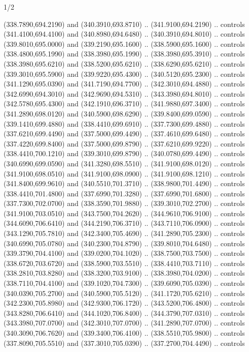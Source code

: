 \begin{flagdescription}{1/2}
\begin{scope}[xshift=0.5\flaglength]
\begin{scope}[scale=0.00745\flagwidth,xshift=-12.1mm,yshift=41.7mm]
\begin{scope}[y=0.80pt, x=0.80pt, yscale=-1, xscale=1, inner sep=0pt, outer sep=0pt]
\begin{scope}[cm={{1.33333,0.0,0.0,-1.33333,(0.0,114.66667)}}]
\begin{scope}[scale=0.100]
  (338.7890,694.2190) and (340.3910,693.8710) .. (341.9100,694.2190) .. controls
  (341.4100,694.4100) and (340.8980,694.6480) .. (340.3910,694.8010) .. controls
  (339.8010,695.0000) and (339.2190,695.1600) .. (338.5900,695.1600) .. controls
  (338.4800,695.1990) and (338.3980,695.1990) .. (338.3980,695.3910) .. controls
  (338.3980,695.6210) and (338.5200,695.6210) .. (338.6290,695.6210) .. controls
  (339.3010,695.5900) and (339.9220,695.4300) .. (340.5120,695.2300) .. controls
  (341.1290,695.0390) and (341.7190,694.7700) .. (342.3010,694.4880) .. controls
  (342.6990,694.3010) and (342.9690,694.5310) .. (343.3980,694.8010) .. controls
  (342.5780,695.4300) and (342.1910,696.3710) .. (341.9880,697.3400) .. controls
  (341.2890,698.0120) and (340.5900,698.6290) .. (339.8400,699.0590) .. controls
  (339.1410,699.4880) and (338.4410,699.6910) .. (337.7300,699.4880) .. controls
  (337.6210,699.4490) and (337.5000,699.4490) .. (337.4610,699.6480) .. controls
  (337.4220,699.8400) and (337.5000,699.8790) .. (337.6210,699.9220) .. controls
  (338.4410,700.1210) and (339.3010,699.8790) .. (340.0780,699.4490) .. controls
  (340.6990,699.0590) and (341.3280,698.5510) .. (341.9100,698.0120) .. controls
  (341.9100,698.0510) and (341.9100,698.0900) .. (341.9100,698.1210) .. controls
  (341.8400,699.9610) and (340.5510,701.3710) .. (338.9800,701.4490) .. controls
  (338.4410,701.4800) and (337.6990,701.3280) .. (337.6990,701.6800) .. controls
  (337.7300,702.0700) and (338.3590,701.9880) .. (339.3010,702.2700) .. controls
  (341.9100,703.0510) and (343.7500,704.2620) .. (344.9610,706.9100) .. controls
  (344.6090,706.6410) and (344.2190,706.3710) .. (343.7110,706.0900) .. controls
  (343.1290,705.7810) and (342.3400,705.4690) .. (341.2890,705.2300) .. controls
  (340.6990,705.0780) and (340.2300,704.8790) .. (339.8010,704.6480) .. controls
  (339.3790,704.4100) and (339.0200,704.1020) .. (338.7500,703.7500) .. controls
  (338.6720,703.6720) and (338.5900,703.5510) .. (338.4410,703.7110) .. controls
  (338.2810,703.8280) and (338.3200,703.9100) .. (338.3980,704.0200) .. controls
  (338.7110,704.4100) and (339.1020,704.7300) .. (339.6090,705.0390) .. controls
  (340.0390,705.2700) and (340.5900,705.5120) .. (341.1720,705.6210) .. controls
  (342.2300,705.8980) and (342.9300,706.1720) .. (343.5200,706.4800) .. controls
  (343.8280,706.6410) and (344.1020,706.8400) .. (344.3790,707.0310) .. controls
  (343.3980,707.0700) and (342.3010,707.0700) .. (341.2890,707.0700) .. controls
  (340.3090,706.7620) and (339.3400,706.4100) .. (338.5510,705.9800) .. controls
  (337.8090,705.5510) and (337.3010,705.0390) .. (337.2700,704.4490) .. controls

\end{scope}
\end{scope}
\end{scope}
\end{scope}
\end{scope}
\end{flagdescription}
